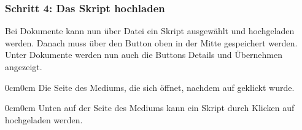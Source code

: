 \documentclass[parskip=off,index=totocnumbered]{scrartcl}
\newenvironment{rückkeinstück}
	{\begin{adjustwidth}{0cm}{0cm}\footnotesize \singlespace \centering} 
	{\end{adjustwidth} \onehalfspacing}
\begin{document}
              
\subsubsection*{Schritt 4: Das Skript hochladen}
Bei \textsf{Dokumente} kann nun über \colorbox{LightSteelBlue3!60!}{\textsf{Datei}} ein Skript ausgewählt und hochgeladen werden. Danach muss über den Button oben in der Mitte gespeichert werden. Unter \textsf{Dokumente} werden nun auch die Buttons \colorbox{LightSteelBlue3!60!}{\textsf{Details}} und \colorbox{LightSteelBlue3!60!}{\textsf{Übernehmen}} angezeigt. 
\vspace{0.6cm}

\noindent \begin{minipage}{\textwidth}
    \begin{rückkeinstück}
        Die Seite des Mediums, die sich öffnet, nachdem auf  geklickt wurde.
        \vspace{0.6cm}
    \end{rückkeinstück}
\end{minipage}

\noindent \begin{minipage}{\textwidth}
    \begin{rückkeinstück}
        Unten auf der Seite des Mediums kann ein Skript durch Klicken auf  hochgeladen werden. 
        \vspace{0.6cm}
    \end{rückkeinstück}
\end{minipage}
\end{document}
